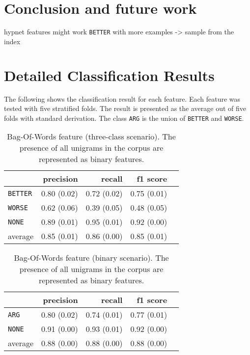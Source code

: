 \chapter{Conclusion and future work}
hypnet features might work \texttt{BETTER} with more examples -> sample from the index

\appendix
	\chapter{Detailed Classification Results}

	\setcounter{section}{1}
	The following shows the classification result for each feature. Each feature was tested with five stratified folds. The result is presented as the average out of five folds with standard derivation. The class \texttt{ARG} is the union of \texttt{BETTER} and \texttt{WORSE}.
	

	
	\begin{table}[h] 
		\centering 
		\caption{Bag-Of-Words feature (three-class scenario). The presence of all unigrams in the corpus are represented as binary features.} 
		\label{  }
		\begin{tabular}{@{}lrrrr@{}}
			\toprule
			        & precision                & recall                   & f1 score                 \\ \midrule 
			\texttt{BETTER}  & 0.80 \scriptsize{(0.02)} & 0.72 \scriptsize{(0.02)} & 0.75 \scriptsize{(0.01)} \\ 
			\texttt{WORSE}   & 0.62 \scriptsize{(0.06)} & 0.39 \scriptsize{(0.05)} & 0.48 \scriptsize{(0.05)} \\ 
			\texttt{NONE}    & 0.89 \scriptsize{(0.01)} & 0.95 \scriptsize{(0.01)} & 0.92 \scriptsize{(0.00)} \\ 
			average & 0.85 \scriptsize{(0.01)} & 0.86 \scriptsize{(0.00)} & 0.85 \scriptsize{(0.01)} \\ 
			\bottomrule
		\end{tabular}
	\end{table}
	
	
	\begin{table}[h] 
		\centering 
		\caption{Bag-Of-Words feature (binary scenario). The presence of all unigrams in the corpus are represented as binary features.} 
		\label{  }
		\begin{tabular}{@{}lrrrr@{}}
			\toprule
			        & precision                & recall                   & f1 score                 \\ \midrule 
			\texttt{ARG}     & 0.80 \scriptsize{(0.02)} & 0.74 \scriptsize{(0.01)} & 0.77 \scriptsize{(0.01)} \\ 
			\texttt{NONE}    & 0.91 \scriptsize{(0.00)} & 0.93 \scriptsize{(0.01)} & 0.92 \scriptsize{(0.00)} \\ 
			average & 0.88 \scriptsize{(0.00)} & 0.88 \scriptsize{(0.00)} & 0.88 \scriptsize{(0.00)} \\ 
			\bottomrule
		\end{tabular}
	\end{table}
	
